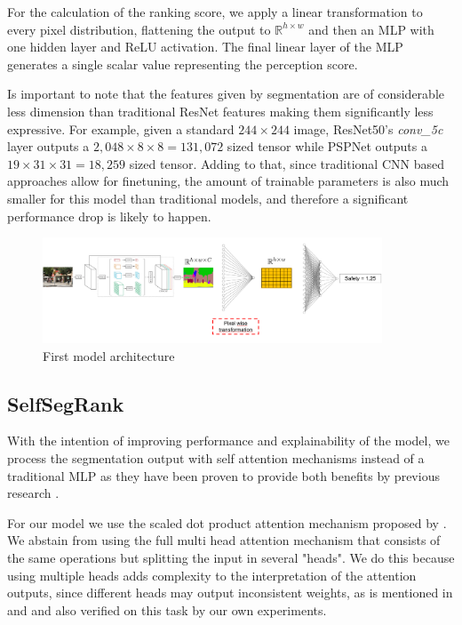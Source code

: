 For the calculation of the ranking score, we apply a linear transformation to every pixel distribution, flattening the output to
$\mathbb{R}^{h \times w}$  and then an MLP with one hidden layer and ReLU activation. The final linear layer
of the MLP generates a single scalar value representing the perception score.

Is important to note that the features given by  segmentation are  of considerable less dimension
than traditional ResNet features making them  significantly less expressive. For example, given a standard $244 \times 244$ image,
ResNet50's \textit{conv\_5c} layer outputs a $2,048 \times 8 \times 8 = 131,072$ sized
tensor while PSPNet outputs a $19 \times 31 \times 31 = 18,259$ sized tensor. Adding to that,
since traditional CNN based approaches allow for finetuning, the amount of trainable parameters
is also much smaller for this model than traditional models, and therefore a significant
performance drop is likely to happen.

\begin{figure}[ht]
	\begin{center}
	\includegraphics[width=0.9\textwidth]{./figures/segrank_1.png}
	\caption[First model architecture]{First model architecture}
	\label{fig:segrank_1}
	\end{center}
\end{figure}

\subsection{SelfSegRank}\label{section:self-attn}
With the intention of improving performance and explainability of the model, we process
the segmentation output with self attention mechanisms instead of a traditional MLP as
they have been proven to provide both benefits by previous research \cite{vaswani_attention, wiegreffe_attention, cordonnier_relationship}.

For our model we use the scaled dot product attention mechanism
proposed by . We abstain from using the full multi head attention
mechanism  that consists of the same operations but splitting the input in several "heads".
We do this because using multiple heads adds complexity to the interpretation of the attention outputs,
since different heads may output inconsistent weights, as is mentioned in 
and  and also verified on this task by our own experiments.

